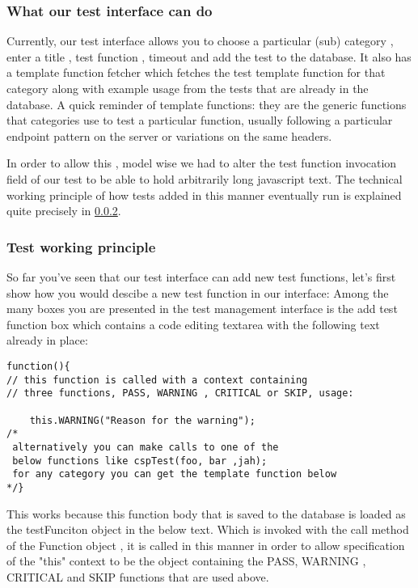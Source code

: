 \subsubsection{What our test interface can do}

Currently, our test interface allows you to choose a particular (sub) category , enter a title , test function , timeout and add the test to the database.
It also has a template function fetcher which fetches the test template function for that category along with example usage from the tests that are already in the database.
A quick reminder of template functions: they are the generic functions that categories use to test a particular function, usually following a particular
endpoint pattern on the server or variations on the same headers.

In order to allow this , model wise we had to alter the test function invocation field of our test to be able to hold arbitrarily long javascript text.
The technical working principle of how tests added in this manner eventually run is explained quite precisely in \ref{subsec:princ}. 



\subsubsection{Test working principle}
\label{subsec:princ}

So far you've seen that our test interface can add new test functions, let's first show how you would descibe a new test function in our interface:
Among the many boxes you are presented in the test management interface is the add test function box which contains a code editing textarea with the following
text already in place:
\begin{verbatim}
function(){
// this function is called with a context containing
// three functions, PASS, WARNING , CRITICAL or SKIP, usage:

	this.WARNING("Reason for the warning");
/*
 alternatively you can make calls to one of the 
 below functions like cspTest(foo, bar ,jah); 
 for any category you can get the template function below
*/} 
\end{verbatim}

This works because this function body that is saved to the database is loaded as the testFunciton object in the below text.
Which is invoked with the call method of the Function object , it is called in this manner in order to allow specification
of the "this" context to be the object containing the PASS, WARNING , CRITICAL and SKIP functions that are used above. 

